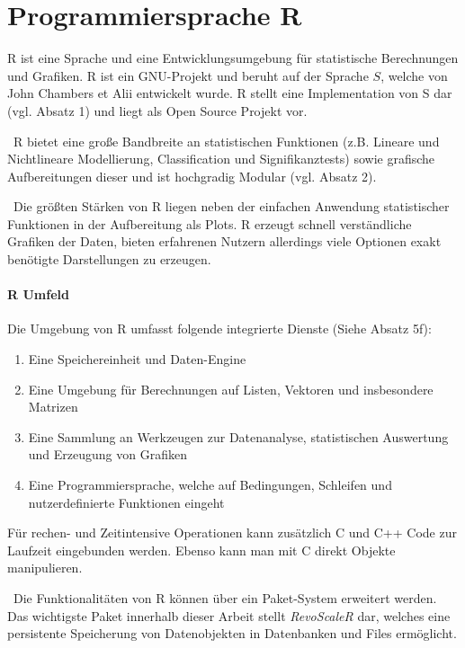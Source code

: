 \section{Programmiersprache R}
\label{sec:R}
R ist eine Sprache und eine Entwicklungsumgebung für statistische Berechnungen und Grafiken. R ist ein GNU-Projekt und beruht auf der Sprache $S$, welche von John Chambers et Alii entwickelt wurde. R stellt eine Implementation von S dar (vgl. \cite{RProject} Absatz 1) und liegt als Open Source Projekt vor.

~\newline R bietet eine große Bandbreite an statistischen Funktionen (z.B. Lineare und Nichtlineare Modellierung, Classification und Signifikanztests) sowie grafische Aufbereitungen dieser und ist hochgradig Modular (vgl. \cite{RProject} Absatz 2). 

~\newline Die größten Stärken von R liegen neben der einfachen Anwendung statistischer Funktionen in der Aufbereitung als Plots. R erzeugt schnell verständliche Grafiken der Daten, bieten erfahrenen Nutzern allerdings viele Optionen exakt benötigte Darstellungen zu erzeugen. 

\paragraph{ R Umfeld} 
Die Umgebung von R umfasst folgende integrierte Dienste (Siehe \cite{RProject} Absatz 5f):
\begin{enumerate}
	\item Eine Speichereinheit und Daten-Engine
	\item Eine Umgebung für Berechnungen auf Listen, Vektoren und insbesondere Matrizen
	\item Eine Sammlung an Werkzeugen zur Datenanalyse, statistischen Auswertung und Erzeugung von Grafiken
	\item Eine Programmiersprache, welche auf Bedingungen, Schleifen und nutzerdefinierte Funktionen eingeht
\end{enumerate}

Für rechen- und Zeitintensive Operationen kann zusätzlich C und C++ Code zur Laufzeit eingebunden werden. Ebenso kann man mit C direkt Objekte manipulieren. 

~\newline Die Funktionalitäten von R können über ein Paket-System erweitert werden. Das wichtigste Paket innerhalb dieser Arbeit stellt \textit{RevoScaleR} dar, welches eine persistente Speicherung von Datenobjekten in Datenbanken und Files ermöglicht. 

